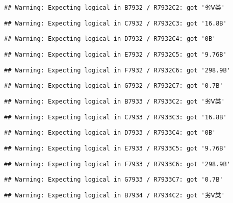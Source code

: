 \documentclass[
]{article}
\begin{document}
\begin{verbatim}
## Warning: Expecting logical in B7932 / R7932C2: got '劣Ⅴ类'
\end{verbatim}

\begin{verbatim}
## Warning: Expecting logical in C7932 / R7932C3: got '16.8B'
\end{verbatim}

\begin{verbatim}
## Warning: Expecting logical in D7932 / R7932C4: got '0B'
\end{verbatim}

\begin{verbatim}
## Warning: Expecting logical in E7932 / R7932C5: got '9.76B'
\end{verbatim}

\begin{verbatim}
## Warning: Expecting logical in F7932 / R7932C6: got '298.9B'
\end{verbatim}

\begin{verbatim}
## Warning: Expecting logical in G7932 / R7932C7: got '0.7B'
\end{verbatim}

\begin{verbatim}
## Warning: Expecting logical in B7933 / R7933C2: got '劣Ⅴ类'
\end{verbatim}

\begin{verbatim}
## Warning: Expecting logical in C7933 / R7933C3: got '16.8B'
\end{verbatim}

\begin{verbatim}
## Warning: Expecting logical in D7933 / R7933C4: got '0B'
\end{verbatim}

\begin{verbatim}
## Warning: Expecting logical in E7933 / R7933C5: got '9.76B'
\end{verbatim}

\begin{verbatim}
## Warning: Expecting logical in F7933 / R7933C6: got '298.9B'
\end{verbatim}

\begin{verbatim}
## Warning: Expecting logical in G7933 / R7933C7: got '0.7B'
\end{verbatim}

\begin{verbatim}
## Warning: Expecting logical in B7934 / R7934C2: got '劣Ⅴ类'
\end{verbatim}
\end{document}
